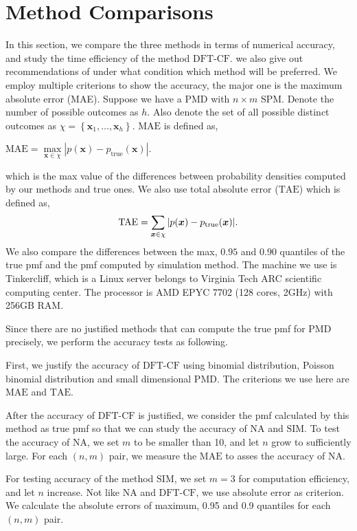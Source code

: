 \documentclass[12pt]{article}
\newcommand{\TAE}{{\textrm{TAE}}}
\newcommand{\MAE}{{\textrm{MAE}}}
\newcommand{\PMD}{\textrm{PMD}}
\newcommand{\xvec}{\boldsymbol{x}}
\newcommand{\SIM}{{\textrm{SIM}}}
\newcommand{\NA}{{\textrm{NA}}}
\newcommand{\dft}{{\textrm{DFT-CF}}}
\begin{document}
\section{Method Comparisons}\label{sec:Method Comparisons}
In this section, we compare the three methods in terms of numerical accuracy, and study the time efficiency of the method $\dft$. we also give out recommendations of under what condition which method will be preferred. We employ multiple criterions to show the accuracy, the major one is the maximum absolute error (MAE). Suppose we have a PMD with $n\times m$ SPM. Denote the number of possible outcomes as $h$. Also denote the set of all possible distinct outcomes as $\chi = \left\{\xvec_1,\dots, \xvec_{h}\right\}$. $\MAE$ is defined as,
\begin{center}
$\mathrm{\MAE} = \underset{\xvec \in \chi}{\max}|p(\xvec) - p_{\text{true}}(\xvec)|$.
\end{center}
which is the max value of the differences between probability densities computed by our methods and true ones.
We also use total absolute error ($\TAE$) which is defined as,
\begin{equation*}
    \mbox{\TAE} = \sum_{\xvec \in \chi} |p(\xvec) - p_{\text{true}}(\xvec)|.
\end{equation*}
We also compare the differences between the max, $0.95$ and $0.90$ quantiles of the true pmf and the pmf computed by simulation method. The machine we use is Tinkercliff, which is a Linux server belongs to Virginia Tech ARC scientific computing center. The processor is AMD EPYC 7702 (128 cores, 2GHz) with 256GB RAM. 

Since there are no justified methods that can compute the true pmf for $\PMD$ precisely, we perform the accuracy tests as following. 

First, we justify the accuracy of $\dft$ using binomial distribution, Poisson binomial distribution and small dimensional PMD. The criterions we use here are $\MAE$ and $\TAE$. 

After the accuracy of $\dft$ is justified, we consider the pmf calculated by this method as true pmf so that we can study the accuracy of $\NA$ and $\SIM$. To test the accuracy of $\NA$, we set $m$ to be smaller than 10, and let $n$ grow to sufficiently large. For each $(n,m)$ pair, we measure the $\MAE$ to asses the accuracy of $\NA$.

For testing accuracy of the method $\SIM$, we set $m=3$ for computation efficiency, and let $n$ increase. Not like $\NA$ and $\dft$, we use absolute error as criterion. We calculate the absolute errors of maximum, 0.95 and 0.9 quantiles for each $(n,m)$ pair.
\end{document}
